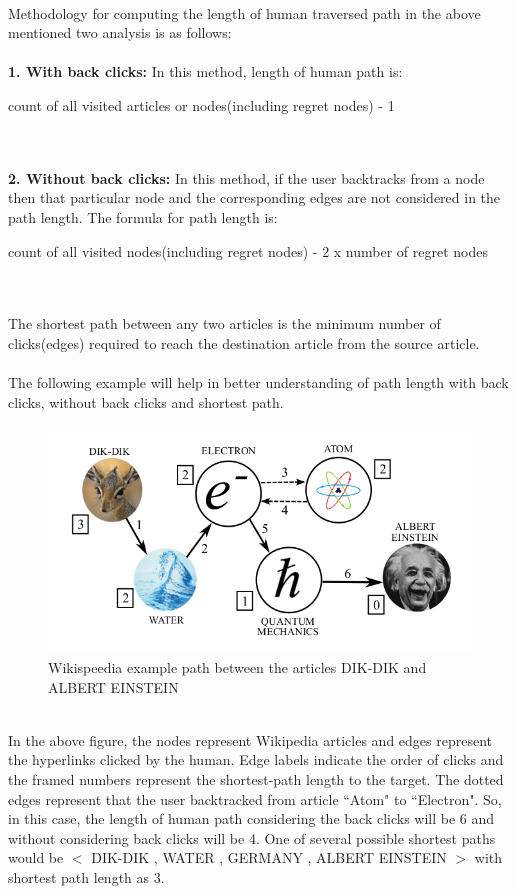 \documentclass{article}
\begin{document}
\begin{itemize}
    \\
    Methodology for computing the length of human traversed path in the above mentioned two analysis is as follows:\\
    \\
    \textbf{1. With back clicks: }In this method, length of human path is: \\
    \centerline{count of all visited articles or nodes(including regret nodes) - 1}\\
    \\
    \textbf{2. Without back clicks: }In this method, if the user backtracks from a node then that particular node and the corresponding edges are not considered in the path length. The formula for path length is:\\
    \centerline{count of all visited nodes(including regret nodes) - 2 x number of regret nodes}\\
    \\
    The shortest path between any two articles is the minimum number of clicks(edges) required to reach the destination article from the source article.\\
    \\
    The following example will help in better understanding of path length with back clicks, without back clicks and shortest path.
\\
\begin{figure}[h]
\centerline{\includegraphics[scale=0.7]{photo1.png}}
\caption{Wikispeedia example path between the articles DIK-DIK and ALBERT EINSTEIN}
\label{fig}
\end{figure}\\
In the above figure, the nodes represent Wikipedia articles and edges represent the hyperlinks clicked by the human. Edge labels indicate the order of clicks and the framed numbers represent the shortest-path length to the target. The dotted edges represent that the user backtracked from article ``Atom" to ``Electron". So, in this case, the length of human path considering the back clicks will be 6 and without considering back clicks will be 4. One of several possible shortest paths would be $<$ DIK-DIK , WATER , GERMANY , ALBERT EINSTEIN $>$ with shortest path length as 3.

\end{itemize}
\end{document}
